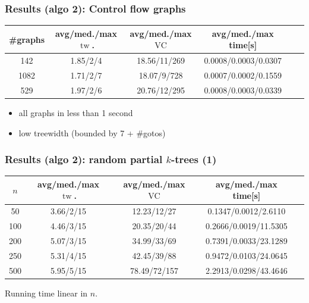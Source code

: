 \documentclass[11pt]{beamer}
\DeclareMathOperator{\tw}{tw}
\DeclareMathOperator{\VC}{VC}
\begin{document}
\begin{frame}
\frametitle{Results (algo 2): Control flow graphs}

\begin{center}
\footnotesize
\begin{table}[h!]
\centering
\begin{tabular}{|c|c|c|c|c|c|}
\hline
\#graphs & avg/med./max $\tw$. & avg/med./max $\VC$ & avg/med./max time[s] \\
\hline \hline
142 & 1.85/2/4 & 18.56/11/269 & 0.0008/0.0003/0.0307 \\
\hline
1082 & 1.71/2/7 & 18.07/9/728 & 0.0007/0.0002/0.1559 \\
\hline
529 & 1.97/2/6 & 20.76/12/295 & 0.0008/0.0003/0.0339 \\
\hline
\end{tabular}
\end{table}
\end{center}

\begin{itemize}
\item all graphs in less than 1 second
\item low treewidth (bounded by 7 + \#gotos)
\end{itemize}

\end{frame}



\begin{frame}
\frametitle{Results (algo 2): random partial $k$-trees (1)}

\begin{center}
\footnotesize
\begin{table}[h!]
\centering
\begin{tabular}{|c|c|c|c|c|}
\hline
$n$ & avg/med./max $\tw$. & avg/med./max $\VC$ & avg/med./max time[s] \\
\hline \hline
50 & 3.66/2/15 & 12.23/12/27 & 0.1347/0.0012/2.6110 \\
\hline
100 & 4.46/3/15 & 20.35/20/44 & 0.2666/0.0019/11.5305 \\
\hline
200 & 5.07/3/15 & 34.99/33/69 & 0.7391/0.0033/23.1289 \\
\hline
250 & 5.31/4/15 & 42.45/39/88 & 0.9472/0.0103/24.0645 \\
\hline
500 & 5.95/5/15 & 78.49/72/157 & 2.2913/0.0298/43.4646 \\
\hline
\end{tabular}
\end{table}
\end{center}

Running time linear in $n$.

\end{frame}
\end{document}
